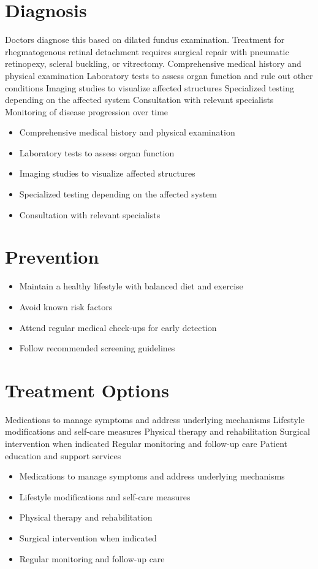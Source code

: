 \section{Diagnosis}
Doctors diagnose this based on dilated fundus examination. Treatment for rhegmatogenous retinal detachment requires surgical repair with pneumatic retinopexy, scleral buckling, or vitrectomy. Comprehensive medical history and physical examination Laboratory tests to assess organ function and rule out other conditions Imaging studies to visualize affected structures Specialized testing depending on the affected system Consultation with relevant specialists Monitoring of disease progression over time

\begin{itemize}[noitemsep]
  \item Comprehensive medical history and physical examination
  \item Laboratory tests to assess organ function
  \item Imaging studies to visualize affected structures
  \item Specialized testing depending on the affected system
  \item Consultation with relevant specialists
\end{itemize}
\section{Prevention}
\begin{itemize}[noitemsep]
  \item Maintain a healthy lifestyle with balanced diet and exercise
  \item Avoid known risk factors
  \item Attend regular medical check-ups for early detection
  \item Follow recommended screening guidelines
\end{itemize}
\section{Treatment Options}
Medications to manage symptoms and address underlying mechanisms Lifestyle modifications and self-care measures Physical therapy and rehabilitation Surgical intervention when indicated Regular monitoring and follow-up care Patient education and support services

\begin{itemize}[noitemsep]
  \item Medications to manage symptoms and address underlying mechanisms
  \item Lifestyle modifications and self-care measures
  \item Physical therapy and rehabilitation
  \item Surgical intervention when indicated
  \item Regular monitoring and follow-up care
\end{itemize}
